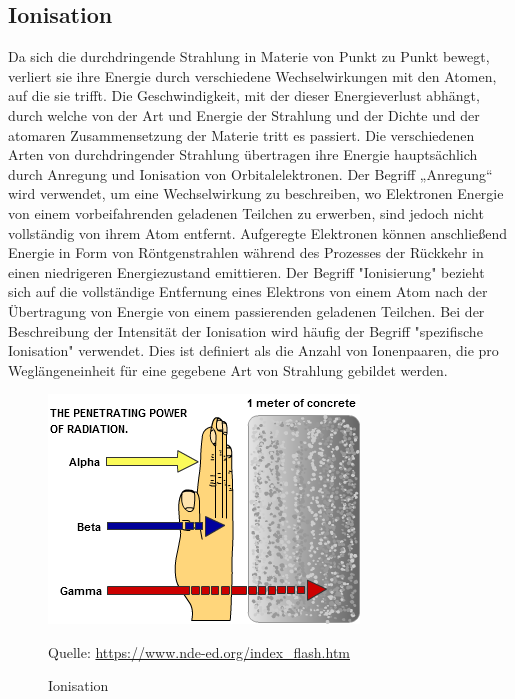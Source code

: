 {{\subsection{Ionisation}
Da sich die durchdringende Strahlung in Materie von Punkt zu Punkt bewegt, verliert sie ihre Energie durch verschiedene Wechselwirkungen mit den Atomen, auf die sie trifft.
Die Geschwindigkeit, mit der dieser Energieverlust abhängt, durch welche von der Art und Energie der Strahlung und der Dichte und der atomaren Zusammensetzung der Materie tritt es passiert.
Die verschiedenen Arten von durchdringender Strahlung übertragen ihre Energie hauptsächlich durch Anregung und Ionisation von Orbitalelektronen. Der Begriff „Anregung“ wird verwendet, um eine Wechselwirkung zu beschreiben, wo Elektronen Energie von einem vorbeifahrenden geladenen Teilchen zu erwerben, sind jedoch nicht vollständig von ihrem Atom entfernt. Aufgeregte Elektronen können anschließend Energie in Form von Röntgenstrahlen während des Prozesses der Rückkehr in einen niedrigeren Energiezustand emittieren. Der Begriff "Ionisierung" bezieht sich auf die vollständige Entfernung eines Elektrons von einem Atom nach der Übertragung von Energie von einem passierenden geladenen Teilchen. Bei der Beschreibung der Intensität der Ionisation wird häufig der Begriff "spezifische Ionisation" verwendet. Dies ist definiert als die Anzahl von Ionenpaaren, die pro Weglängeneinheit für eine gegebene Art von Strahlung gebildet werden.

\begin{figure}[htb]
  \centering  
  \includegraphics[scale=0.5]{img/Ionisation.png}
  \caption{Ionisation}
  \label{fig:Ionisation}
  Quelle: \url{https://www.nde-ed.org/index_flash.htm}
\end{figure}

}}
